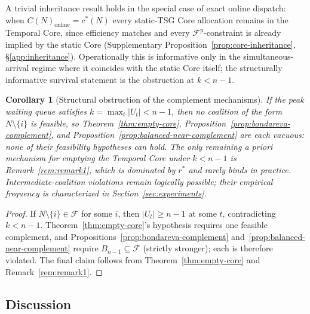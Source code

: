 \documentclass[11pt]{article}
\theoremstyle{plain}
\newtheorem{corollary}[theorem]{Corollary}
\theoremstyle{definition}
\theoremstyle{remark}
\newcommand{\F}{\mathcal{F}}
\newcommand{\Fp}{\mathcal{F}^{\mathrm{p}}}
\newcommand{\cstar}{c^{\ast}}
\begin{document}
A trivial inheritance result holds in the special case of exact online dispatch: when $C(N)_{\text{online}}=\cstar(N)$ every static-TSG Core allocation remains in the Temporal Core, since efficiency matches and every $\Fp$-constraint is already implied by the static Core (Supplementary Proposition~\ref{prop:core-inheritance}, \S\ref{app:inheritance}). Operationally this is informative only in the simultaneous-arrival regime where it coincides with the static Core itself; the structurally informative survival statement is the obstruction at $k<n-1$.

\begin{corollary}[Structural obstruction of the complement mechanisms]
\label{cor:cor52}
If the peak waiting queue satisfies $k=\max_t |U_t| < n-1$, then no coalition of the form $N\setminus\{i\}$ is feasible, so Theorem~\ref{thm:empty-core}, Proposition~\ref{prop:bondareva-complement}, and Proposition~\ref{prop:balanced-near-complement} are each vacuous: none of their feasibility hypotheses can hold. The only remaining \emph{a priori} mechanism for emptying the Temporal Core under $k<n-1$ is Remark~\ref{rem:remark1}, which is dominated by $r^{\ast}$ and rarely binds in practice. Intermediate-coalition violations remain logically possible; their empirical frequency is characterized in Section~\ref{sec:experiments}.
\end{corollary}

\begin{proof}
If $N\setminus\{i\}\in\F$ for some $i$, then $|U_t|\ge n-1$ at some $t$, contradicting $k<n-1$. Theorem~\ref{thm:empty-core}'s hypothesis requires one feasible complement, and Propositions~\ref{prop:bondareva-complement} and~\ref{prop:balanced-near-complement} require $B_{n-1}\subseteq\F$ (strictly stronger); each is therefore violated. The final claim follows from Theorem~\ref{thm:empty-core} and Remark~\ref{rem:remark1}.
\end{proof}

\subsection{Discussion}
\label{ssec:discussion}
\end{document}
